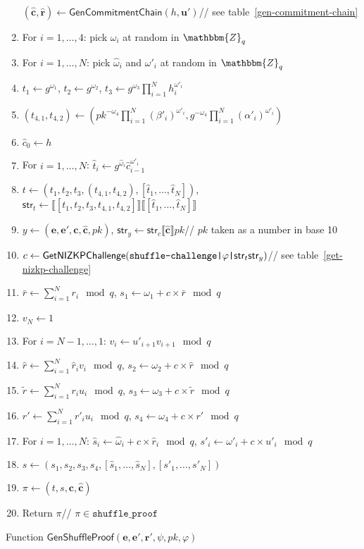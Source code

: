 \documentclass[a4paper]{article}
\newcommand{\Z}{\mathbbm{Z}}
\begin{document}
\begin{table}
\begin{framed}
\begin{enumerate}
      $(\hat{\textbf{c}},\hat{\textbf{r}})\leftarrow\textsf{GenCommitmentChain}(h,\textbf{u}')$\hfill//
      see table~\ref{gen-commitment-chain}
    \item For $i=1,\dots,4$: pick $\omega_i$ at random in $\Z_q$
    \item For $i=1,\dots,N$: pick $\hat{\omega}_i$ and $\omega'_i$ at random in $\Z_q$
    \item $t_1\leftarrow g^{\omega_1}$, $t_2\leftarrow g^{\omega_2}$,
      $t_3\leftarrow g^{\omega_3}\prod_{i=1}^N h_i^{\omega'_i}$
    \item
      $(t_{4,1},t_{4,2})\leftarrow(pk^{-\omega_4}\prod_{i=1}^N(\beta'_i)^{\omega'_i},g^{-\omega_4}\prod_{i=1}^N(\alpha'_i)^{\omega'_i})$
    \item $\hat{c}_0\leftarrow h$
    \item For $i=1,\dots,N$:
      $\hat{t}_i\leftarrow
      g^{\hat{\omega}_i}\hat{c}_{i-1}^{\omega'_i}$
    \item
      $t\leftarrow(t_1,t_2,t_3,(t_{4,1},t_{4,2}),[\hat{t}_1,\dots,\hat{t}_N])$,
      $\textsf{str}_t\leftarrow\llbracket[t_1,t_2,t_3,t_{4,1},t_{4,2}]\rrbracket\llbracket[\hat{t}_1,\dots,\hat{t}_N]\rrbracket$
    \item
      $y\leftarrow(\textbf{e},\textbf{e}',\textbf{c},\hat{\textbf{c}},pk)$,
      $\textsf{str}_y\leftarrow\textsf{str}_c\llbracket\hat{\textbf{c}}\rrbracket
      pk$\hfill// $pk$ taken as a number in base 10
    \item
      $c\leftarrow\textsf{GetNIZKPChallenge}(\verb=shuffle-challenge|=\varphi\verb=|=\textsf{str}_t\textsf{str}_y)$\hfill//
      see table~\ref{get-nizkp-challenge}
    \item $\bar{r}\leftarrow\sum_{i=1}^N r_i\mod q$,
      $s_1\leftarrow\omega_1+c\times\bar{r}\mod q$
    \item $v_N\leftarrow 1$
    \item For $i=N-1,\dots,1$: $v_i\leftarrow u'_{i+1}v_{i+1}\mod q$
    \item $\hat{r}\leftarrow\sum_{i=1}^N \hat{r}_iv_i\mod q$, $s_2\leftarrow\omega_2+c\times\hat{r}\mod q$
    \item $\tilde{r}\leftarrow\sum_{i=1}^N r_iu_i\mod q$, $s_3\leftarrow\omega_3+c\times\tilde{r}\mod q$
    \item $r'\leftarrow\sum_{i=1}^N r'_iu_i\mod q$, $s_4\leftarrow\omega_4+c\times r'\mod q$
    \item For $i=1,\dots,N$:
      $\hat{s}_i\leftarrow\hat{\omega}_i+c\times\hat{r}_i\mod q$,
      $s'_i\leftarrow\omega'_i+c\times u'_i\mod q$
    \item
      $s\leftarrow(s_1,s_2,s_3,s_4,[\hat{s}_1,\dots,\hat{s}_N],[s'_1,\dots,s'_N])$
    \item $\pi\leftarrow(t,s,\textbf{c},\hat{\textbf{c}})$
    \item Return $\pi$\hfill// $\pi\in\texttt{shuffle\_proof}$
    \end{enumerate}
  \end{framed}
  \caption{Function $\mathsf{GenShuffleProof}(\textbf{e},\textbf{e}',\textbf{r}',\psi,pk,\varphi)$}
  \label{gen-shuffle-proof}
\end{table}
\end{document}
